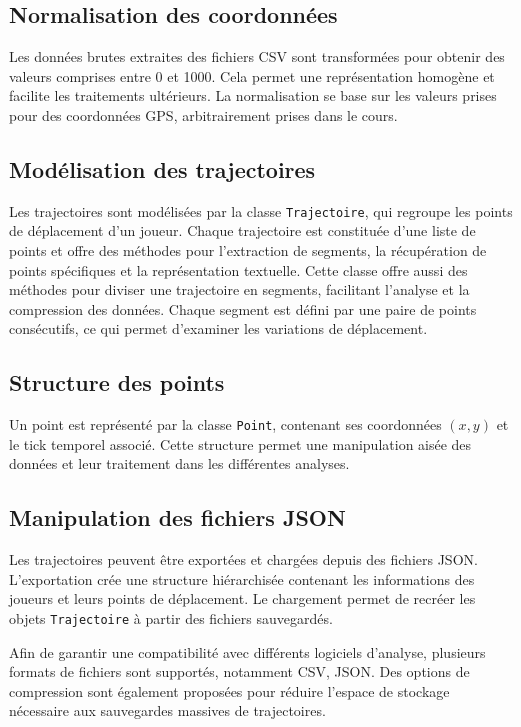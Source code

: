\documentclass{article}
\begin{document}
        
        \subsection{Normalisation des coordonnées}
        Les données brutes extraites des fichiers CSV sont transformées pour obtenir des valeurs comprises entre 0 et 1000. Cela permet une représentation homogène et facilite les traitements ultérieurs. La normalisation se base sur les valeurs prises pour des coordonnées GPS, arbitrairement prises dans le cours.

        
        \subsection{Modélisation des trajectoires}
        Les trajectoires sont modélisées par la classe \texttt{Trajectoire}, qui regroupe les points de déplacement d'un joueur. Chaque trajectoire est constituée d'une liste de points et offre des méthodes pour l'extraction de segments, la récupération de points spécifiques et la représentation textuelle. Cette classe offre aussi des méthodes pour diviser une trajectoire en segments, facilitant l'analyse et la compression des données. Chaque segment est défini par une paire de points consécutifs, ce qui permet d'examiner les variations de déplacement.
        
        \subsection{Structure des points}
        Un point est représenté par la classe \texttt{Point}, contenant ses coordonnées $(x, y)$ et le tick temporel associé. Cette structure permet une manipulation aisée des données et leur traitement dans les différentes analyses.
        

        
        \subsection{Manipulation des fichiers JSON}
        Les trajectoires peuvent être exportées et chargées depuis des fichiers JSON. L'exportation crée une structure hiérarchisée contenant les informations des joueurs et leurs points de déplacement. Le chargement permet de recréer les objets \texttt{Trajectoire} à partir des fichiers sauvegardés.
        
        Afin de garantir une compatibilité avec différents logiciels d’analyse, plusieurs formats de fichiers sont supportés, notamment CSV, JSON. Des options de compression sont également proposées pour réduire l’espace de stockage nécessaire aux sauvegardes massives de trajectoires.
\end{document}
